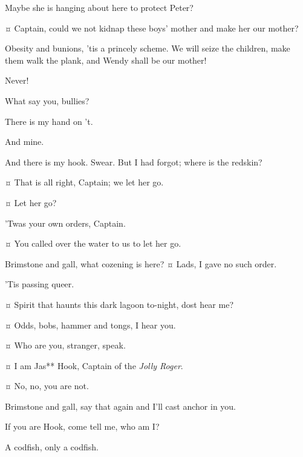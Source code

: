 \begin{drama}
\starkeyspeaks
Maybe she is hanging about here to protect Peter?


\smeespeaks {}¤
Captain, could we not kidnap these boys’ mother and make her our mother?

\hookspeaks
Obesity and bunions, ’tis a princely scheme.
We will seize the children, make them walk the plank, and Wendy shall be our mother!

\wendyspeaks
Never!

\hookspeaks
What say you, bullies?

\smeespeaks
There is my hand on ’t.

\starkeyspeaks
And mine.

\hookspeaks
And there is my hook.
Swear.
But I had forgot; where is the redskin?

\smeespeaks {}¤
That is all right, Captain; we let her go.

\hookspeaks {}¤
Let her go?

\smeespeaks
’Twas your own orders, Captain.

\starkeyspeaks {}¤
You called over the water to us to let her go.

\hookspeaks
Brimstone and gall, what cozening is here?
¤
Lads, I gave no such order.

\smeespeaks
’Tis passing queer.

\hookspeaks {}¤
Spirit that haunts this dark lagoon to-night, dost hear me?

\peterspeaks {}¤
Odds, bobs, hammer and tongs, I hear you.

\hookspeaks {}¤
Who are you, stranger, speak.

\peterspeaks {}¤
I am Jas** Hook, Captain of the \emph{Jolly Roger}.

\hookspeaks {}¤
No, no, you are not.

\peterspeaks
Brimstone and gall, say that again and I’ll cast anchor in you.

\hookspeaks
If you are Hook, come tell me, who am I?

\peterspeaks
A codfish, only a codfish.


\end{drama}
